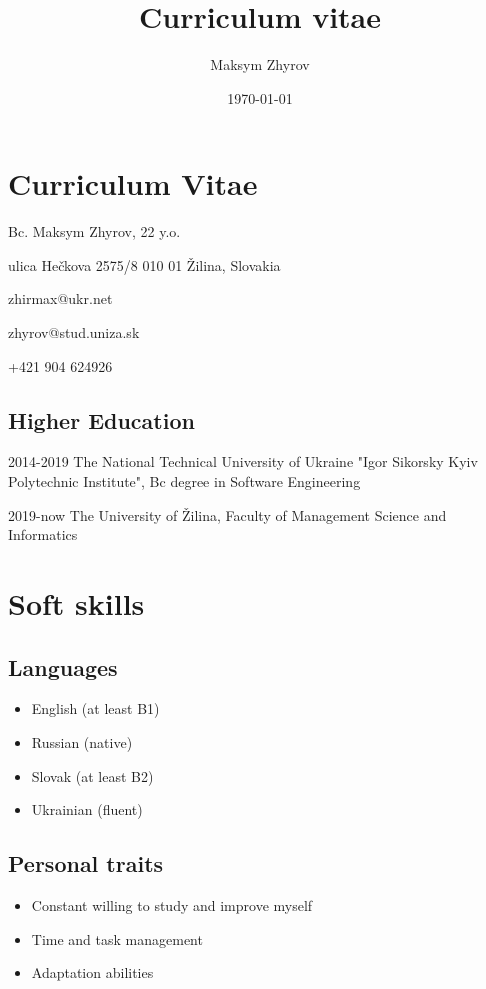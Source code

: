 \documentclass[a4paper,12pt]{article}
\author{Maksym Zhyrov}
\title{Curriculum vitae}
\date{\today}
\begin{document}
\section*{Curriculum Vitae}

{\Large Bc. Maksym Zhyrov, 22 y.o.}

ulica Hečkova 2575/8
010 01 Žilina, 
Slovakia

zhirmax@ukr.net

zhyrov@stud.uniza.sk 

+421 904 624926

\subsection*{Higher Education}

2014-2019 The National Technical University of Ukraine 
"Igor Sikorsky Kyiv Polytechnic Institute",
Bc degree in Software Engineering

2019-now The University of Žilina,
Faculty of Management Science and Informatics

\section*{Soft skills}

\subsection*{Languages}

\begin{multicols}{2}
\begin{itemize}
    \item English (at least B1)
    \item Russian (native)
    \item Slovak (at least B2)
    \item Ukrainian (fluent)
\end{itemize}
\end{multicols}

\subsection*{Personal traits}

\begin{itemize}
    \item Constant willing to study and improve myself
    \item Time and task management
    \item Adaptation abilities
\end{itemize}
\end{document}
